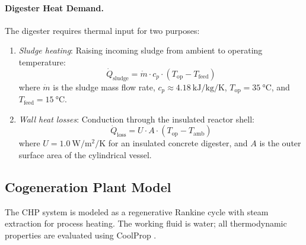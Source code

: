 \documentclass[12pt, letterpaper]{article}
\begin{document}
\paragraph{Digester Heat Demand.}
The digester requires thermal input for two purposes:
\begin{enumerate}[noitemsep]
  \item \textit{Sludge heating}: Raising incoming sludge from ambient to operating temperature:
  \begin{equation}
    \dot{Q}_\text{sludge} = \dot{m} \cdot c_p \cdot (T_\text{op} - T_\text{feed})
    \label{eq:q_sludge}
  \end{equation}
  where $\dot{m}$ is the sludge mass flow rate, $c_p \approx \SI{4.18}{\kilo\joule\per\kilo\gram\per\kelvin}$, $T_\text{op} = \SI{35}{\celsius}$, and $T_\text{feed} = \SI{15}{\celsius}$.

  \item \textit{Wall heat losses}: Conduction through the insulated reactor shell:
  \begin{equation}
    \dot{Q}_\text{loss} = U \cdot A \cdot (T_\text{op} - T_\text{amb})
    \label{eq:q_loss}
  \end{equation}
  where $U = \SI{1.0}{\watt\per\square\metre\per\kelvin}$ for an insulated concrete digester, and $A$ is the outer surface area of the cylindrical vessel.
\end{enumerate}

\subsection{Cogeneration Plant Model}

The CHP system is modeled as a regenerative Rankine cycle with steam extraction for process heating. The working fluid is water; all thermodynamic properties are evaluated using CoolProp \citep{coolprop}.
\end{document}
